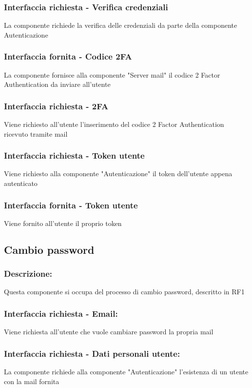 \documentclass{report}
\begin{document}
\subsubsection{Interfaccia richiesta - Verifica credenziali }La componente richiede la verifica delle credenziali da parte della componente Autenticazione
\subsubsection{Interfaccia fornita - Codice 2FA} La componente fornisce alla componente "Server mail" il codice 2 Factor Authentication da inviare all'utente

\subsubsection{Interfaccia richiesta - 2FA } Viene richiesto all'utente l'inserimento del codice 2 Factor Authentication ricevuto tramite mail
\subsubsection{Interfaccia richiesta - Token utente} Viene richiesto alla componente "Autenticazione" il token dell'utente appena autenticato
\subsubsection{Interfaccia fornita - Token utente} Viene fornito all'utente il proprio token

\subsection*{Cambio password}
\subsubsection{Descrizione: }Questa componente si occupa del processo di cambio password, descritto in RF1
\subsubsection{Interfaccia richiesta - Email: } Viene richiesta all'utente che vuole cambiare password la propria mail
\subsubsection{Interfaccia richiesta - Dati personali utente: } La componente richiede alla componente "Autenticazione" l'esistenza di un utente con la mail fornita
\end{document}
